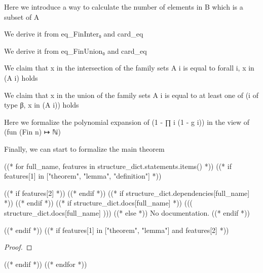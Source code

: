 \begin{lemma}\label{card_eq_sum_char_fun}
                Here we introduce a way to calculate the number of elements in B which is a subset of A
    \end{lemma}

\begin{lemma}\label{card_eq_FinInter}
                We derive it from eq_FinInter₀ and card_eq
    \end{lemma}

\begin{lemma}\label{card_eq_FinUnion}
                We derive it from eq_FinUnion₀ and card_eq
    \end{lemma}

\begin{lemma}\label{char_fun_FinInter}
                We claim that x in the intersection of the family sets {A i} is equal to forall i, x in (A i) holds
    \end{lemma}

\begin{lemma}\label{char_fun_FinUnion}
                We claim that x in the union of the family sets {A i} is equal to at least one of (i of type β, x in (A i)) holds
    \end{lemma}

\begin{lemma}\label{mul_expand₀}
                Here we formalize the polynomial expansion of (1 - ∏ i (1 - g i)) in the view of (fun (Fin n) ↦ ℕ)
    \end{lemma}

\begin{theorem}\label{Principle_of_Inclusion_Exclusion}
                Finally, we can start to formalize the main theorem
    \end{theorem}




((* for full_name, features in structure_dict.statements.items() *))
((* if features[1] in ["theorem", "lemma", "definition"] *))
\begin{((( features[1] )))}\label{((( full_name )))}
    ((* if features[2] *))
    \leanok
    ((* endif *))
    ((* if structure_dict.dependencies[full_name] *))
    ((* endif *))
    ((* if structure_dict.docs[full_name] *))
        ((( structure_dict.docs[full_name] )))
    ((* else *))
        No documentation.
    ((* endif *))
\end{((( features[1] )))}

((* endif *))
((* if features[1] in ["theorem", "lemma"] and features[2] *))
\begin{proof}
    \leanok
\end{proof}

((* endif *))
((* endfor *))
